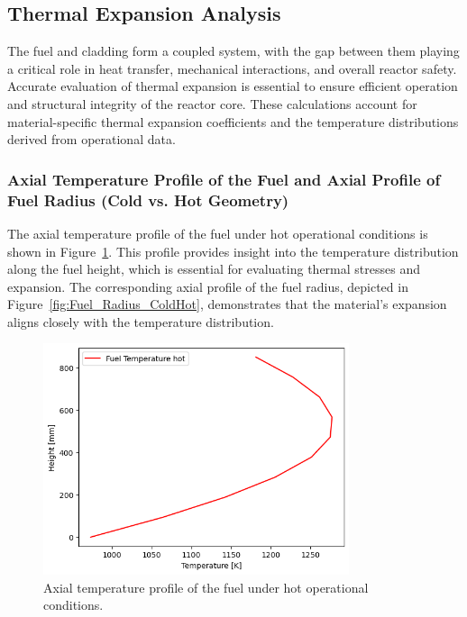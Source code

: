 \subsection{Thermal Expansion Analysis}

The fuel and cladding form a coupled system, with the gap between them playing a critical role in heat transfer, mechanical interactions, and overall reactor safety. Accurate evaluation of thermal expansion is essential to ensure efficient operation and structural integrity of the reactor core. These calculations account for material-specific thermal expansion coefficients and the temperature distributions derived from operational data.

\subsubsection{Axial Temperature Profile of the Fuel and Axial Profile of Fuel Radius (Cold vs. Hot Geometry)}

The axial temperature profile of the fuel under hot operational conditions is shown in Figure~\ref{fig:Fuel_Temperature_Hot}. This profile provides insight into the temperature distribution along the fuel height, which is essential for evaluating thermal stresses and expansion. The corresponding axial profile of the fuel radius, depicted in Figure~\ref{fig:Fuel_Radius_ColdHot}, demonstrates that the material’s expansion aligns closely with the temperature distribution.

\begin{figure}[H]
\centering
\includegraphics[width=0.8\textwidth]{1a_fuel_hot.png}
\caption{Axial temperature profile of the fuel under hot operational conditions.}
\label{fig:Fuel_Temperature_Hot}
\end{figure}

